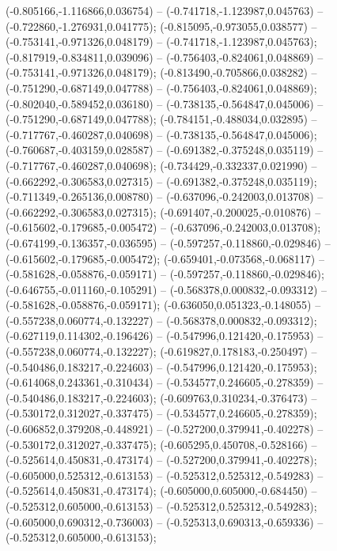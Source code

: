  (-0.805166,-1.116866,0.036754) -- (-0.741718,-1.123987,0.045763) -- (-0.722860,-1.276931,0.041775);
 (-0.815095,-0.973055,0.038577) -- (-0.753141,-0.971326,0.048179) -- (-0.741718,-1.123987,0.045763);
 (-0.817919,-0.834811,0.039096) -- (-0.756403,-0.824061,0.048869) -- (-0.753141,-0.971326,0.048179);
 (-0.813490,-0.705866,0.038282) -- (-0.751290,-0.687149,0.047788) -- (-0.756403,-0.824061,0.048869);
 (-0.802040,-0.589452,0.036180) -- (-0.738135,-0.564847,0.045006) -- (-0.751290,-0.687149,0.047788);
 (-0.784151,-0.488034,0.032895) -- (-0.717767,-0.460287,0.040698) -- (-0.738135,-0.564847,0.045006);
 (-0.760687,-0.403159,0.028587) -- (-0.691382,-0.375248,0.035119) -- (-0.717767,-0.460287,0.040698);
 (-0.734429,-0.332337,0.021990) -- (-0.662292,-0.306583,0.027315) -- (-0.691382,-0.375248,0.035119);
 (-0.711349,-0.265136,0.008780) -- (-0.637096,-0.242003,0.013708) -- (-0.662292,-0.306583,0.027315);
 (-0.691407,-0.200025,-0.010876) -- (-0.615602,-0.179685,-0.005472) -- (-0.637096,-0.242003,0.013708);
 (-0.674199,-0.136357,-0.036595) -- (-0.597257,-0.118860,-0.029846) -- (-0.615602,-0.179685,-0.005472);
 (-0.659401,-0.073568,-0.068117) -- (-0.581628,-0.058876,-0.059171) -- (-0.597257,-0.118860,-0.029846);
 (-0.646755,-0.011160,-0.105291) -- (-0.568378,0.000832,-0.093312) -- (-0.581628,-0.058876,-0.059171);
 (-0.636050,0.051323,-0.148055) -- (-0.557238,0.060774,-0.132227) -- (-0.568378,0.000832,-0.093312);
 (-0.627119,0.114302,-0.196426) -- (-0.547996,0.121420,-0.175953) -- (-0.557238,0.060774,-0.132227);
 (-0.619827,0.178183,-0.250497) -- (-0.540486,0.183217,-0.224603) -- (-0.547996,0.121420,-0.175953);
 (-0.614068,0.243361,-0.310434) -- (-0.534577,0.246605,-0.278359) -- (-0.540486,0.183217,-0.224603);
 (-0.609763,0.310234,-0.376473) -- (-0.530172,0.312027,-0.337475) -- (-0.534577,0.246605,-0.278359);
 (-0.606852,0.379208,-0.448921) -- (-0.527200,0.379941,-0.402278) -- (-0.530172,0.312027,-0.337475);
 (-0.605295,0.450708,-0.528166) -- (-0.525614,0.450831,-0.473174) -- (-0.527200,0.379941,-0.402278);
 (-0.605000,0.525312,-0.613153) -- (-0.525312,0.525312,-0.549283) -- (-0.525614,0.450831,-0.473174);
 (-0.605000,0.605000,-0.684450) -- (-0.525312,0.605000,-0.613153) -- (-0.525312,0.525312,-0.549283);
 (-0.605000,0.690312,-0.736003) -- (-0.525313,0.690313,-0.659336) -- (-0.525312,0.605000,-0.613153);
